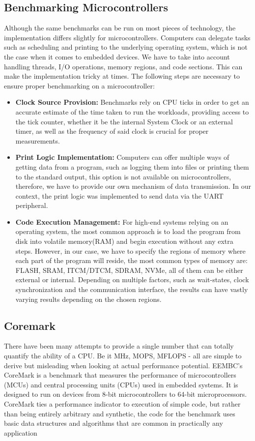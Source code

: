 \subsection{Benchmarking Microcontrollers}
Although the same benchmarks can be run on most pieces of technology, the implementation differs slightly for microcontrollers. Computers can delegate tasks such as scheduling and printing to the underlying operating system, which is not the case when it comes to embedded devices. We have to take into account handling threads, I/O operations, memory regions, and code sections. This can make the implementation tricky at times.
The following steps are necessary to ensure proper benchmarking on a microcontroller:
\begin{itemize}
    \item \textbf{Clock Source Provision:} Benchmarks rely on CPU ticks in order to get an accurate estimate of the time taken to run the workloads, providing access to the tick counter, whether it be the internal System Clock or an external timer, as well as the frequency of said clock is crucial for proper measurements.
    \item \textbf{Print Logic Implementation:} Computers can offer multiple ways of getting data from a program, such as logging them into files or printing them to the standard output, this option is not available on microcontrollers, therefore, we have to provide our own mechanism of data transmission. In our context, the print logic was implemented to send data via the UART peripheral.  
    \item \textbf{Code Execution Management:} For high-end systems relying on an operating system, the most common approach is to load the program from disk into volatile memory(RAM) and begin execution without any extra steps. However, in our case, we have to specify the regions of memory where each part of the program will reside, the most common types of memory are: FLASH, SRAM, ITCM/DTCM, SDRAM, NVMe, all of them can be either external or internal. Depending on multiple factors, such as wait-states, clock synchronization and the communication interface, the results can have vastly varying results depending on the chosen regions.
\end{itemize}
\subsection{Coremark}
There have been many attempts to provide a single number that can totally quantify the
ability of a CPU. Be it MHz, MOPS, MFLOPS - all are simple to derive but misleading
when looking at actual performance potential.
EEMBC’s CoreMark is a benchmark that measures the performance of microcontrollers (MCUs) and central processing units (CPUs) used in embedded systems.
It is designed to run on devices from 8-bit microcontrollers to 64-bit microprocessors.
CoreMark ties a performance indicator to execution of simple
code, but rather than being entirely arbitrary and synthetic, the code for the benchmark
uses basic data structures and algorithms that are common in practically any application
